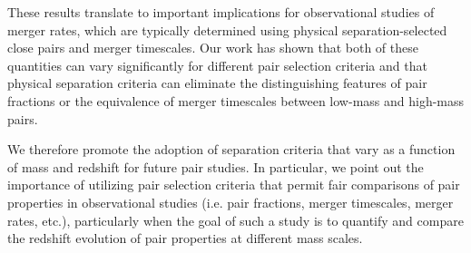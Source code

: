 \documentclass[twocolumn,linenumbers]{aastex631}
\begin{document}
            
            These results translate to important implications for observational studies of merger rates, which are typically determined using physical separation-selected close pairs and merger timescales. 
            Our work has shown that both of these quantities can vary significantly for different pair selection criteria and that physical separation criteria can eliminate the distinguishing features of pair fractions or the equivalence of merger timescales between low-mass and high-mass pairs.
             
            We therefore promote the adoption of separation criteria that vary as a function of mass and redshift for future pair studies. 
            In particular, we point out the importance of utilizing pair selection criteria that permit fair comparisons of pair properties in observational studies (i.e. pair fractions, merger timescales, merger rates, etc.), particularly when the goal of such a study is to quantify and compare the redshift evolution of pair properties at different mass scales.
            
\end{document}
